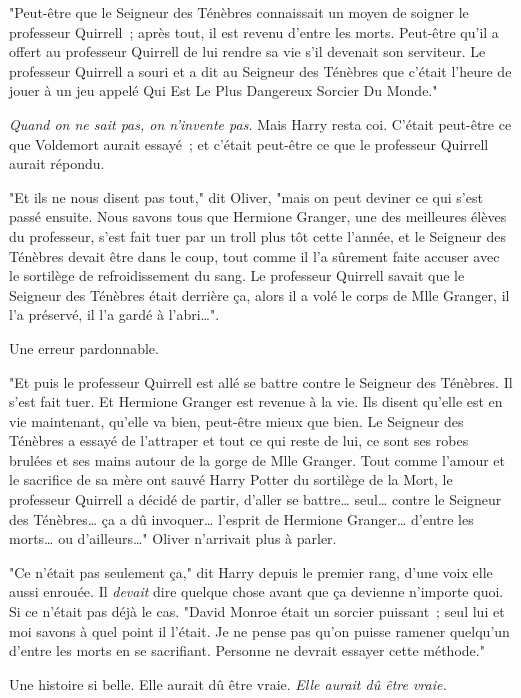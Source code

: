 "Peut-être que le Seigneur des Ténèbres connaissait un moyen de soigner le professeur Quirrell~; après tout, il est revenu d'entre les morts. Peut-être qu'il a offert au professeur Quirrell de lui rendre sa vie s'il devenait son serviteur. Le professeur Quirrell a souri et a dit au Seigneur des Ténèbres que c'était l'heure de jouer à un jeu appelé Qui Est Le Plus Dangereux Sorcier Du Monde."

\emph{Quand on ne sait pas, on n'invente pas.} Mais Harry resta coi. C'était peut-être ce que Voldemort aurait essayé~; et c'était peut-être ce que le professeur Quirrell aurait répondu.

"Et ils ne nous disent pas tout," dit Oliver, "mais on peut deviner ce qui s'est passé ensuite. Nous savons tous que Hermione Granger, une des meilleures élèves du professeur, s'est fait tuer par un troll plus tôt cette l'année, et le Seigneur des Ténèbres devait être dans le coup, tout comme il l'a sûrement faite accuser avec le sortilège de refroidissement du sang. Le professeur Quirrell savait que le Seigneur des Ténèbres était derrière ça, alors il a volé le corps de Mlle Granger, il l'a préservé, il l'a gardé à l'abri…".

Une erreur pardonnable.

"Et puis le professeur Quirrell est allé se battre contre le Seigneur des Ténèbres. Il s'est fait tuer. Et Hermione Granger est revenue à la vie. Ils disent qu'elle est en vie maintenant, qu'elle va bien, peut-être mieux que bien. Le Seigneur des Ténèbres a essayé de l'attraper et tout ce qui reste de lui, ce sont ses robes brulées et ses mains autour de la gorge de Mlle Granger. Tout comme l'amour et le sacrifice de sa mère ont sauvé Harry Potter du sortilège de la Mort, le professeur Quirrell a décidé de partir, d'aller se battre… seul… contre le Seigneur des Ténèbres… ça a dû invoquer… l'esprit de Hermione Granger… d'entre les morts… ou d'ailleurs…" Oliver n'arrivait plus à parler.

"Ce n'était pas seulement ça," dit Harry depuis le premier rang, d'une voix elle aussi enrouée. Il \emph{devait} dire quelque chose avant que ça devienne n'importe quoi. Si ce n'était pas déjà le cas. "David Monroe était un sorcier puissant~; seul lui et moi savons à quel point il l'était. Je ne pense pas qu'on puisse ramener quelqu'un d'entre les morts en se sacrifiant. Personne ne devrait essayer cette méthode."

Une histoire si belle. Elle aurait dû être vraie. \emph{Elle aurait dû être vraie.}

